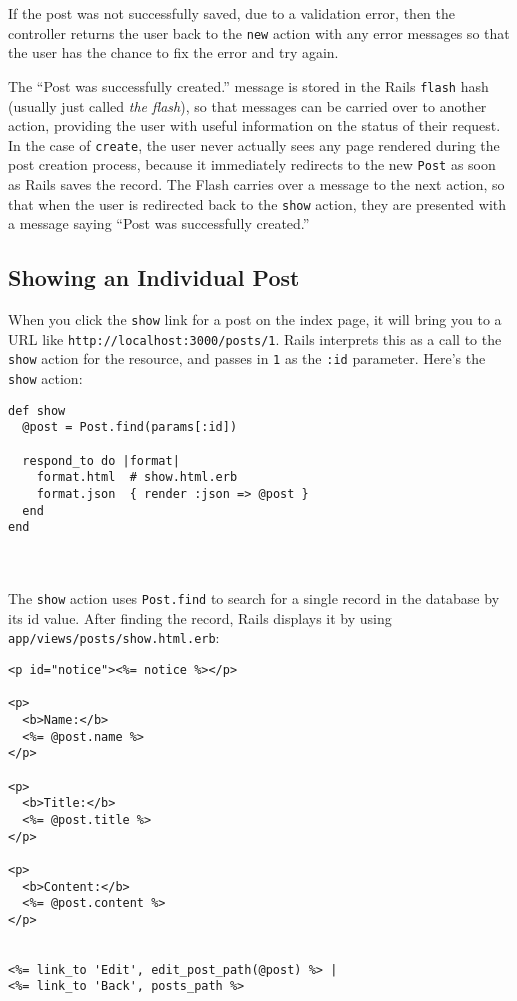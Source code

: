 \documentclass[10pt]{book}
\begin{document}
If the post was not successfully saved, due to a validation error, then the controller returns the user back to the \texttt{new} action with any error messages so that the user has the chance to fix the error and try again.

The “Post was successfully created.” message is stored in the Rails \texttt{flash} hash (usually just called \emph{the flash}), so that messages can be carried over to another action, providing the user with useful information on the status of their request. In the case of \texttt{create}, the user never actually sees any page rendered during the post creation process, because it immediately redirects to the new \texttt{Post} as soon as Rails saves the record. The Flash carries over a message to the next action, so that when the user is redirected back to the \texttt{show} action, they are presented with a message saying “Post was successfully created.”

\subsection{ Showing an Individual Post}

When you click the \texttt{show} link for a post on the index page, it will bring you to a URL like \texttt{http://localhost:3000/posts/1}. Rails interprets this as a call to the \texttt{show} action for the resource, and passes in \texttt{1} as the \texttt{:id} parameter. Here’s the \texttt{show} action:

\begin{minipage}{\textwidth}
\begin{verbatim}
def show
  @post = Post.find(params[:id])
 
  respond_to do |format|
    format.html  # show.html.erb
    format.json  { render :json => @post }
  end
end
\end{verbatim}
\end{minipage}
\\  \\

The \texttt{show} action uses \texttt{Post.find} to search for a single record in the database by its id value. After finding the record, Rails displays it by using \texttt{app/views/posts/show.html.erb}:


\begin{verbatim}
<p id="notice"><%= notice %></p>
 
<p>
  <b>Name:</b>
  <%= @post.name %>
</p>
 
<p>
  <b>Title:</b>
  <%= @post.title %>
</p>
 
<p>
  <b>Content:</b>
  <%= @post.content %>
</p>
 
 
<%= link_to 'Edit', edit_post_path(@post) %> |
<%= link_to 'Back', posts_path %>
\end{verbatim}
\end{document}
